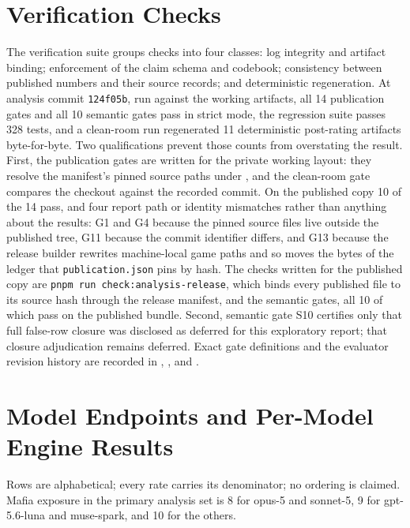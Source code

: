 \documentclass[11pt]{article}
\newcommand{\code}[1]{\texttt{#1}}
\begin{document}
\section{Verification Checks}
\label{app:gates}
The verification suite groups checks into four classes: log integrity and artifact binding; enforcement of the claim schema and codebook; consistency between published numbers and their source records; and deterministic regeneration. At analysis commit \code{124f05b}, run against the working artifacts, all 14 publication gates and all 10 semantic gates pass in strict mode, the regression suite passes 328 tests, and a clean-room run regenerated 11 deterministic post-rating artifacts byte-for-byte. Two qualifications prevent those counts from overstating the result. First, the publication gates are written for the private working layout: they resolve the manifest's pinned source paths under , and the clean-room gate compares the checkout against the recorded commit. On the published copy 10 of the 14 pass, and four report path or identity mismatches rather than anything about the results: G1 and G4 because the pinned source files live outside the published tree, G11 because the commit identifier differs, and G13 because the release builder rewrites machine-local game paths and so moves the bytes of the ledger that \code{publication.json} pins by hash. The checks written for the published copy are \code{pnpm run check:analysis-release}, which binds every published file to its source hash through the release manifest, and the semantic gates, all 10 of which pass on the published bundle. Second, semantic gate S10 certifies only that full false-row closure was disclosed as deferred for this exploratory report; that closure adjudication remains deferred. Exact gate definitions and the evaluator revision history are recorded in , , and .

\section{Model Endpoints and Per-Model Engine Results}
\label{app:models}
Rows are alphabetical; every rate carries its denominator; no ordering is claimed. Mafia exposure in the primary analysis set is 8 for opus-5 and sonnet-5, 9 for gpt-5.6-luna and muse-spark, and 10 for the others.
\end{document}
